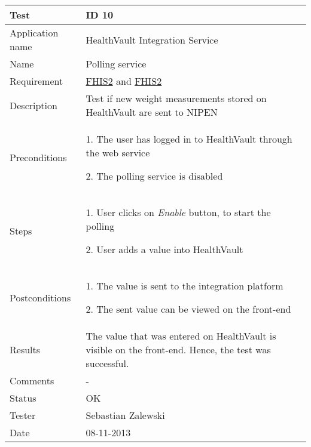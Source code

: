 \begin{table}
\begin{center}
\begin{tabular}{ | l | p{10cm} | }
	\hline
	\textbf{Test}	&	\textbf{ID 10} \\
	\hline\noalign{\smallskip}\noalign{\smallskip}\hline
	Application name	& HealthVault Integration Service \\
	Name				& Polling service \\
	Requirement			& \hyperref[table:reqwebservice]{FHIS2} and \hyperref[table:reqwebservice]{FHIS2} \\
	Description			& Test if new weight measurements stored on HealthVault are sent to NIPEN \\
	Preconditions		&	\par 1. The user has logged in to HealthVault through the web service
							\par 2. The polling service is disabled \\
	Steps 				&	\par 1. User clicks on \textit{Enable} button, to start the polling 
							\par 2. User adds a value into HealthVault \\
	Postconditions		&	\par 1. The value is sent to the integration platform
							\par 2. The sent value can be viewed on the front-end \\
	Results				& The value that was entered on HealthVault is visible on the front-end.
						  Hence, the test was successful. \\
	Comments			& - \\
	Status				& OK \\
	Tester				& Sebastian Zalewski \\
	Date				& 08-11-2013 \\
	\hline
\end{tabular}
\end{center}
\end{table}